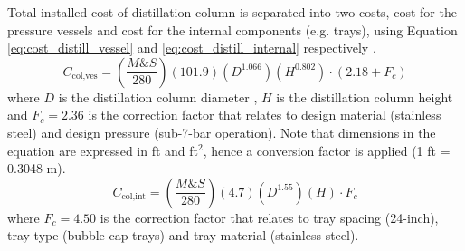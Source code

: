 	\noindent Total installed cost of distillation column is separated into two costs, cost for the pressure vessels and cost for the internal components (e.g. trays), using Equation \ref{eq:cost_distill_vessel} and \ref{eq:cost_distill_internal} respectively \citep{douglas1988}.
	\begin{equation}
	    C_{\text{col,ves}} = \left(\frac{M\&S}{280}\right)\left(101.9\right)\left(D^{1.066}\right)\left(H^{0.802}\right)\cdot (2.18 + F_c)
	    \label{eq:cost_distill_vessel}
	\end{equation}
	where $D$ is the distillation column diameter , $H$ is the distillation column height and $F_c = 2.36$ is the correction factor that relates to design material (stainless steel) and design pressure (sub-7-bar operation). Note that dimensions in the equation are expressed in ft and ft$^2$, hence a conversion factor is applied (1 ft = 0.3048 m).\\
	\begin{equation}
	    C_{\text{col,int}} = \left(\frac{M\&S}{280}\right)\left(4.7\right)\left(D^{1.55}\right)\left(H\right)\cdot F_c
	    \label{eq:cost_distill_internal}
	\end{equation}
	where $F_c = 4.50$ is the correction factor that relates to tray spacing (24-inch), tray type (bubble-cap trays) and tray material (stainless steel). \\
    
